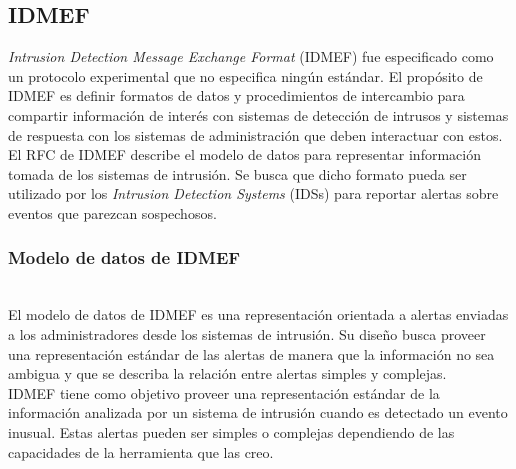 \subsection{IDMEF}

\textit{Intrusion Detection Message Exchange Format} (IDMEF) fue especificado como un 
protocolo experimental que no especifica ningún estándar. El propósito de 
IDMEF es definir formatos de datos y procedimientos de intercambio para 
compartir información de interés con sistemas de detección de intrusos y 
sistemas de respuesta con los sistemas de administración que deben 
interactuar con estos. El RFC de IDMEF describe el modelo de datos para 
representar información tomada de los sistemas de intrusión. Se busca que dicho 
formato pueda ser utilizado por los \textit{Intrusion Detection Systems} (IDSs) para 
reportar alertas sobre eventos que parezcan sospechosos.\\

\subsubsection{Modelo de datos de IDMEF}\ \\
El modelo de datos de IDMEF es una representación orientada a alertas enviadas a 
los administradores desde los sistemas de intrusión. Su diseño busca proveer una representación estándar de las 
alertas de manera que la información no sea ambigua y que se describa la 
relación entre alertas simples y complejas.\\

IDMEF tiene como objetivo proveer una representación estándar de la 
información analizada por un sistema de intrusión cuando es detectado 
un evento inusual. Estas alertas pueden ser simples o complejas 
dependiendo de las capacidades de la herramienta que las creo.\\



